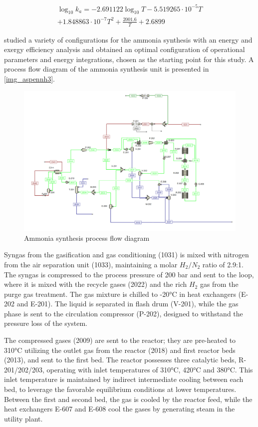 \documentclass[a4paper, titlepage]{article}
\begin{document}
\begin{multline}
	\log_{10}k_a = -2.691122\log_{10}T - 5.519265\cdot10^{-5}T \\
	 + 1.848863\cdot10^{-7}T^2 + \frac{2001.6}{T} + 2.6899
\end{multline}

\textcite{florez-orregoProcessSynthesisOptimization2018} studied a variety of configurations for the ammonia synthesis
with an energy and exergy efficiency analysis and obtained an optimal configuration of operational parameters and 
energy integrations, chosen as the starting point for this study. A process flow diagram of the ammonia synthesis 
unit is presented in \autoref{img_aspennh3}.

\begin{figure}
	\includegraphics[width=\textwidth]{img/aspen_nh3.png}
	\caption{Ammonia synthesis process flow diagram}
	\label{img_aspennh3}
\end{figure}

Syngas from the gasification and gas conditioning (1031) is mixed with nitrogen from the air separation unit (1033), 
maintaining a molar $H_2/N_2$ ratio of 2.9:1. The syngas is compressed to the process pressure of 200 bar and sent to 
the loop, where it is mixed with the recycle gases (2022) and the rich $H_2$ gas from the purge gas treatment. 
The gas mixture is chilled to -20°C in heat exchangers (E-202 and E-201). The liquid is separated in flash drum 
(V-201), while the gas phase is sent to the circulation compressor (P-202), designed to withstand the pressure loss 
of the system. 

The compressed gases (2009) are sent to the reactor; they are pre-heated to 310°C utilizing the outlet gas from the 
reactor (2018) and first reactor beds (2013), and sent to the first bed. The reactor possesses three catalytic beds, 
R-201/202/203, operating with inlet temperatures of 310°C, 420°C and 380°C. This inlet temperature is maintained by 
indirect intermediate cooling between each bed, to leverage the favorable equilibrium conditions at lower temperatures.
Between the first and second bed, the gas is cooled by the reactor feed, while the heat exchangers E-607 and E-608 cool
the gases by generating steam in the utility plant. 
\end{document}
